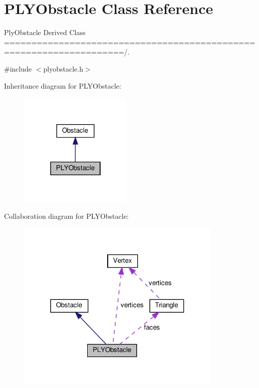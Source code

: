 \hypertarget{class_p_l_y_obstacle}{}\section{P\+L\+Y\+Obstacle Class Reference}
\label{class_p_l_y_obstacle}


Ply\+Obstacle Derived Class ====================================================================/.  




{\ttfamily \#include $<$plyobstacle.\+h$>$}



Inheritance diagram for P\+L\+Y\+Obstacle\+:\nopagebreak
\begin{figure}[H]
\begin{center}
\leavevmode
\includegraphics[width=154pt]{class_p_l_y_obstacle__inherit__graph}
\end{center}
\end{figure}


Collaboration diagram for P\+L\+Y\+Obstacle\+:\nopagebreak
\begin{figure}[H]
\begin{center}
\leavevmode
\includegraphics[width=280pt]{class_p_l_y_obstacle__coll__graph}
\end{center}
\end{figure}
